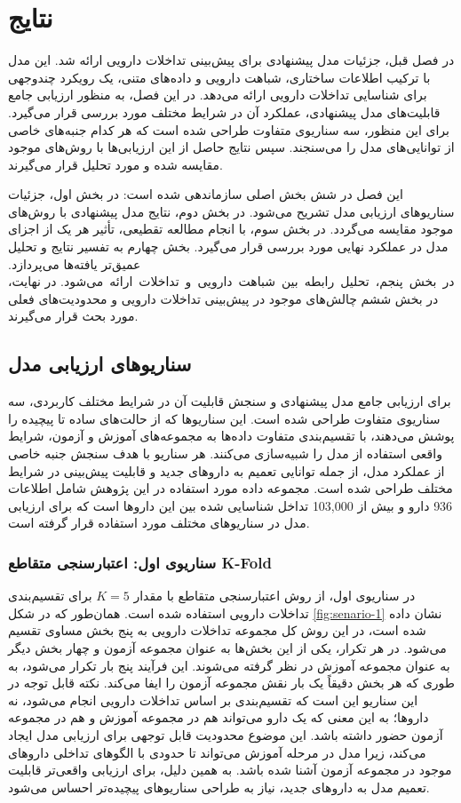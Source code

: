\chapter{نتایج}

در فصل قبل، جزئیات مدل پیشنهادی برای پیش‌بینی تداخلات دارویی ارائه شد. این مدل با ترکیب اطلاعات ساختاری، شباهت دارویی و داده‌های متنی، یک رویکرد چندوجهی برای شناسایی تداخلات دارویی ارائه می‌دهد. در این فصل، به منظور ارزیابی جامع قابلیت‌های مدل پیشنهادی، عملکرد آن در شرایط مختلف مورد بررسی قرار می‌گیرد. برای این منظور، سه سناریوی متفاوت طراحی شده است که هر کدام جنبه‌های خاصی از توانایی‌های مدل را می‌سنجند. سپس نتایج حاصل از این ارزیابی‌ها با روش‌های موجود مقایسه شده و مورد تحلیل قرار می‌گیرند.

این فصل در شش بخش اصلی سازماندهی شده است: در بخش اول، جزئیات سناریوهای ارزیابی مدل تشریح می‌شود. در بخش دوم، نتایج مدل پیشنهادی با روش‌های موجود مقایسه می‌گردد. در بخش سوم، با انجام مطالعه تقطیعی، تأثیر هر یک از اجزای مدل در عملکرد نهایی مورد بررسی قرار می‌گیرد. بخش چهارم به تفسیر نتایج و تحلیل عمیق‌تر یافته‌ها می‌پردازد. در بخش پنجم، تحلیل رابطه بین شباهت دارویی و تداخلات ارائه می‌شود. در نهایت، در بخش ششم چالش‌های موجود در پیش‌بینی تداخلات دارویی و محدودیت‌های فعلی مورد بحث قرار می‌گیرند.

\section{سناریوهای ارزیابی مدل}

برای ارزیابی جامع مدل پیشنهادی و سنجش قابلیت آن در شرایط مختلف کاربردی، سه سناریوی متفاوت طراحی شده است. این سناریوها که از حالت‌های ساده تا پیچیده را پوشش می‌دهند، با تقسیم‌بندی متفاوت داده‌ها به مجموعه‌های آموزش و آزمون، شرایط واقعی استفاده از مدل را شبیه‌سازی می‌کنند. هر سناریو با هدف سنجش جنبه خاصی از عملکرد مدل، از جمله توانایی تعمیم به داروهای جدید و قابلیت پیش‌بینی در شرایط مختلف طراحی شده است. مجموعه داده مورد استفاده در این پژوهش شامل اطلاعات 936 دارو و بیش از 103,000 تداخل شناسایی شده بین این داروها است که برای ارزیابی مدل در سناریوهای مختلف مورد استفاده قرار گرفته است.


\subsection{سناریوی اول: اعتبارسنجی متقاطع K-Fold}

در سناریوی اول، از روش اعتبارسنجی متقاطع  با مقدار $K=5$ برای تقسیم‌بندی تداخلات دارویی استفاده شده است. همان‌طور که در شکل \ref{fig:senario-1} نشان داده شده است، در این روش کل مجموعه تداخلات دارویی به پنج بخش مساوی تقسیم می‌شود. در هر تکرار، یکی از این بخش‌ها به عنوان مجموعه آزمون و چهار بخش دیگر به عنوان مجموعه آموزش در نظر گرفته می‌شوند. این فرآیند پنج بار تکرار می‌شود، به طوری که هر بخش دقیقاً یک بار نقش مجموعه آزمون را ایفا می‌کند. نکته قابل توجه در این سناریو این است که تقسیم‌بندی بر اساس تداخلات دارویی انجام می‌شود، نه داروها؛ به این معنی که یک دارو می‌تواند هم در مجموعه آموزش و هم در مجموعه آزمون حضور داشته باشد. این موضوع محدودیت قابل توجهی برای ارزیابی مدل ایجاد می‌کند، زیرا مدل در مرحله آموزش می‌تواند تا حدودی با الگوهای تداخلی داروهای موجود در مجموعه آزمون آشنا شده باشد. به همین دلیل، برای ارزیابی واقعی‌تر قابلیت تعمیم مدل به داروهای جدید، نیاز به طراحی سناریوهای پیچیده‌تر احساس می‌شود.

